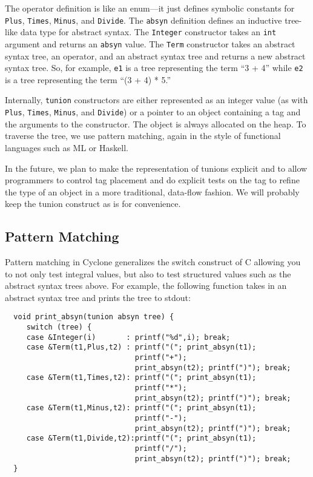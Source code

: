 The operator definition is like an enum---it just defines symbolic
constants for \texttt{Plus}, \texttt{Times}, \texttt{Minus}, and
\texttt{Divide}.  The \texttt{absyn} definition defines an inductive
tree-like data type for abstract syntax.  The \texttt{Integer}
constructor takes an \texttt{int} argument and returns an \texttt{absyn}
value.  The \texttt{Term} constructor takes an abstract syntax tree, an
operator, and an abstract syntax tree and returns a new abstract
syntax tree.  So, for example, \texttt{e1} is a tree representing the
term ``3 + 4'' while \texttt{e2} is a tree representing the term ``(3 +
4) * 5.''

Internally, \texttt{tunion} constructors are either represented as an
integer value (as with \texttt{Plus}, \texttt{Times}, \texttt{Minus}, and
\texttt{Divide}) or a pointer to an object containing a tag and the
arguments to the constructor.  The object is always allocated on the
heap.  To traverse the tree, we use pattern matching, again in the
style of functional languages such as ML or Haskell.

In the future, we plan to make the representation of tunions explicit
and to allow programmers to control tag placement and do explicit
tests on the tag to refine the type of an object in a more
traditional, data-flow fashion.  We will probably keep the tunion
construct as is for convenience.

\subsection{Pattern Matching}
Pattern matching in Cyclone generalizes the switch construct of C
allowing you to not only test integral values, but also to test
structured values such as the abstract syntax trees above.  For
example, the following function takes in an abstract syntax tree and
prints the tree to stdout:
\begin{verbatim}
  void print_absyn(tunion absyn tree) {
     switch (tree) {
     case &Integer(i)       : printf("%d",i); break;
     case &Term(t1,Plus,t2) : printf("("; print_absyn(t1); 
                              printf("+"); 
                              print_absyn(t2); printf(")"); break;
     case &Term(t1,Times,t2): printf("("; print_absyn(t1); 
                              printf("*"); 
                              print_absyn(t2); printf(")"); break;
     case &Term(t1,Minus,t2): printf("("; print_absyn(t1); 
                              printf("-");
                              print_absyn(t2); printf(")"); break;
     case &Term(t1,Divide,t2):printf("("; print_absyn(t1); 
                              printf("/");
                              print_absyn(t2); printf(")"); break;
  }
\end{verbatim}

